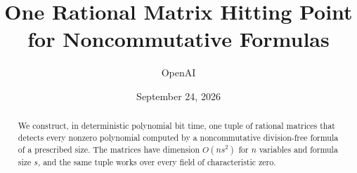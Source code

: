 \documentclass[11pt]{article}
\title{One Rational Matrix Hitting Point\\for Noncommutative Formulas}
\author{OpenAI}
\date{September 24, 2026}
\theoremstyle{definition}
\begin{document}
\maketitle
\begin{abstract}
We construct, in deterministic polynomial bit time, one tuple of rational
matrices that detects every nonzero polynomial computed by a noncommutative
division-free formula of a prescribed size. The matrices have dimension $O(ns^2)$ for
$n$ variables and formula size $s$, and the same tuple works over every
field of characteristic zero.
\end{abstract}
\tableofcontents





{\small


}
\end{document}
